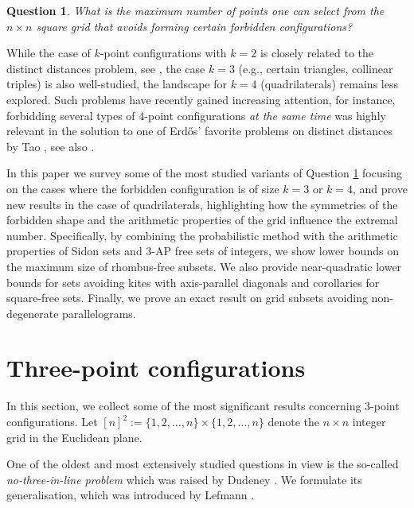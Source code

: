 \documentclass[11pt]{article}
\theoremstyle{plain}
\newtheorem{question}[theorem]{\bf Question}
\begin{document}
	\begin{question}\label{main_q}
		\emph{What is the maximum number of points one can select from the $n\times n$ square grid that avoids forming certain forbidden configurations?}
	\end{question}
	
	
	While the case of $k$-point configurations with $k=2$ is closely related to the distinct distances problem, see \cite{Erdos_dist, dist_vectors, Lef, Sheffer}, the case $k=3$ (e.g., certain triangles, collinear triples) is also well-studied, the landscape for $k=4$ (quadrilaterals) remains less explored.
	Such problems have recently gained increasing attention, for instance, forbidding several types of $4$-point configurations \textit{at the same time} was highly relevant in the solution to one of Erdős' favorite problems on distinct distances by Tao \cite{Tao}, see also \cite{Dumi}.
	
	In this paper we survey some of the most studied variants of Question \ref{main_q} focusing on the cases where the forbidden configuration is of size $k=3$ or $k=4$, and prove  new results in the case of quadrilaterals,  highlighting how the symmetries of the forbidden shape and the arithmetic properties of the grid influence the extremal number. Specifically, by combining the probabilistic method with the arithmetic properties of Sidon sets and $3$-AP free sets of integers, we show lower bounds on the maximum size of rhombus-free subsets. We also provide near-quadratic lower bounds for sets avoiding kites with axis-parallel diagonals  and corollaries  for square-free sets. Finally, we prove an exact result on grid subsets avoiding non-degenerate parallelograms.\\
	
	
	
	
	\section{Three-point configurations}
	
	In this section, we collect some of the most significant results concerning $3$-point configurations.
	Let $[n]^2 := \{1, 2, \dots, n\} \times \{1, 2, \dots, n\}$ denote the $n \times n$ integer grid in the Euclidean plane. 
	
	One of the oldest and 
	most extensively studied  questions in view   is the so-called \textit{no-three-in-line problem} which was raised by Dudeney \cite{Dudeney}. We formulate its generalisation, which was introduced by Lefmann \cite{Lefmann}.
	
\end{document}
